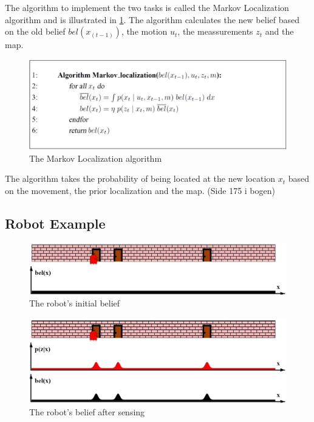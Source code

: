 The algorithm to implement the two tasks is called the Markov Localization algorithm and is illustrated in \ref{fig:markovLocalization}. The algorithm calculates the new belief based on the old belief $bel(x_{(t-1)})$, the motion $u_t$, the meassurements $z_t$ and the map.

\begin{figure}[h]
\centering
\includegraphics[scale=0.25]{images/MarkovLocalization}
\caption{The Markov Localization algorithm}
\label{fig:markovLocalization}
\end{figure}

The algorithm takes the probability of being located at the new location $x_t$ based on the movement, the prior localization and the map. (Side 175 i bogen)

\subsection{Robot Example}

\begin{figure}[h]
\centering
\includegraphics[scale=0.37]{images/MarkovLocalizationA}
\caption{The robot's initial belief}
\label{fig:initialBelief}
\end{figure}

\begin{figure}[h]
\centering
\includegraphics[scale=0.37]{images/MarkovLocalizationB}
\caption{The robot's belief after sensing}
\label{fig:afterSenseBelief}
\end{figure}

